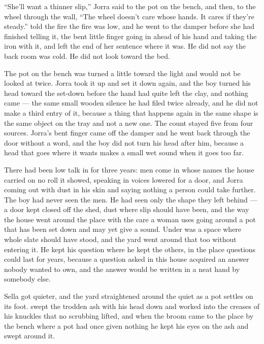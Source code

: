 “She'll want a thinner slip,” Jorra said to the pot on the bench, and then, to the wheel through the wall, “The wheel doesn't care whose hands. It cares if they're steady.”  told the fire the fire was low, and he went to the damper before she had finished telling it, the bent little finger going in ahead of his hand and taking the iron with it, and left the end of her sentence where it was. He did not say the back room was cold. He did not look toward the bed.

The pot on the bench was turned a little toward the light and would not be looked at twice. Jorra took it up and set it down again, and the boy turned his head toward the set-down before the hand had quite left the clay, and nothing came --- the same small wooden silence he had filed twice already, and he did not make a third entry of it, because a thing that happens again in the same shape is the same object on the tray and not a new one. The count stayed five from four sources. Jorra's bent finger came off the damper and he went back through the door without a word, and the boy did not turn his head after him, because a head that goes where it wants makes a small wet sound when it goes too far.

There had been low talk in  for three years: men come in whose names the house carried on no roll it showed, speaking in voices lowered for a door, and Jorra coming out with dust in his skin and saying nothing a person could take further. The boy had never seen the men. He had seen only the shape they left behind --- a door kept closed off the shed, dust where slip should have been, and the way the house went around the place with the care a woman uses going around a pot that has been set down and may yet give a sound. Under  was a space where whole slate should have stood, and the yard went around that too without entering it. He kept his question where he kept the others, in the place questions could last for years, because a question asked in this house acquired an answer nobody wanted to own, and the answer would be written in a neat hand by somebody else.

Sella got quieter, and the yard straightened around the quiet as a pot settles on its foot.  swept the trodden ash with his head down and  worked into the creases of his knuckles that no scrubbing lifted, and when the broom came to the place by the bench where a pot had once given nothing he kept his eyes on the ash and swept around it.

